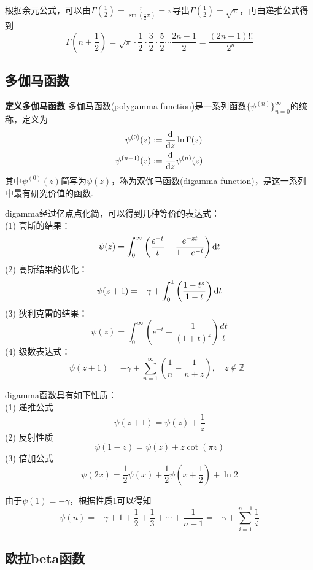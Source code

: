 \documentclass[UTF8]{ctexart}
\newcommand{\trm}[1]{{\rm #1}}
\newenvironment{definition}[1]
    {\begin{tcolorbox}[enhanced, colback=LightYellow, breakable=false, frame hidden, borderline west={1.5mm}{-2mm}{DarkGreen}]
    {\bfseries {\color{DarkGreen} 定义}\quad #1} \newline}
    {\end{tcolorbox}}
\begin{document}
根据余元公式，可以由\(\displaystyle{\Gamma\left(\frac{1}{2}\right) = \frac{\pi}{\sin(\frac{1}{2}\pi)} = \pi}\)导出\(\displaystyle{\Gamma(\frac{1}{2}) = \sqrt{\pi}}\)，再由递推公式得到
\[ \Gamma\left(n+\frac{1}{2}\right) = \sqrt{\pi}\cdot\frac{1}{2}\cdot\frac{3}{2}\cdot\frac{5}{2}\cdots\frac{2n-1}{2} = \frac{(2n-1)!!}{2^n} \]

\subsection{多伽马函数}

\begin{definition}{多伽马函数}
    \uline{多伽马函数}(polygamma function)是一系列函数\(\{\psi^{(n)}\}_{n=0}^{\infty}\)的统称，定义为
    \begin{align*}
        \psi^{(0)}(z) &:= \frac{\trm{d}}{\trm{d}z} \ln \Gamma(z) \\
        \psi^{(n+1)}(z) &:= \frac{\trm{d}}{\trm{d}z} \psi^{(n)}(z)\\
    \end{align*}
    其中\(\psi^{(0)}(z)\)简写为\(\psi(z)\)，称为\uline{双伽马函数}(digamma function)，是这一系列中最有研究价值的函数.
\end{definition}

digamma经过亿点点化简，可以得到几种等价的表达式：\\
(1) 高斯的结果：
\[ \psi(z) = \int_{0}^{\infty} \left( \frac{e^{-t}}{t} - \frac{e^{-zt}}{1-e^{-t}} \right) \trm{d}t \]
(2) 高斯结果的优化：
\[ \psi(z+1) = -\gamma+\int_0^1 \left(\frac{1-t^z}{1-t}\right) \trm{d} t \]
(3) 狄利克雷的结果：
\[ \psi(z)=\int _{0}^{\infty }\left(e^{-t}-{\frac {1}{(1+t)^{z}}}\right) {\frac {dt}{t}} \]
(4) 级数表达式：
\[ \psi (z+1) =-\gamma +\sum _{n=1}^{\infty }\left({\frac {1}{n}}-{\frac {1}{n+z}}\right), \quad z \not \in \mathbb{Z}_-\]

digamma函数具有如下性质：\\
(1) 递推公式
\[ \psi(z+1) = \psi(z)+\frac{1}{z} \]
(2) 反射性质
\[ \psi(1-z) = \psi(z)+z\cot(\pi z) \]
(3) 倍加公式
\[ \psi(2x) = \frac{1}{2}\psi(x) +\frac{1}{2}\psi\left( x+\frac{1}{2} \right) +\ln 2 \]

由于\(\psi(1) = -\gamma\)，根据性质1可以得知
\[\psi(n) = -\gamma + 1 + \frac{1}{2} + \frac{1}{3} + \cdots + \frac{1}{n-1} = -\gamma+\sum_{i=1}^{n-1} \frac{1}{i} \]

\subsection{欧拉beta函数}
\end{document}
